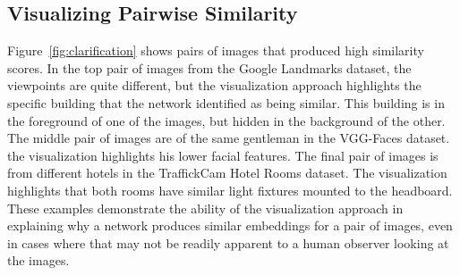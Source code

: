 \subsection{Visualizing Pairwise Similarity}
Figure~\ref{fig:clarification} shows pairs of images that produced high similarity scores. In the top pair of images from the Google Landmarks dataset, the viewpoints are quite different, but the visualization approach highlights the specific building that the network identified as being similar. This building is in the foreground of one of the images, but hidden in the background of the other. The middle pair of images are of the same gentleman in the VGG-Faces dataset. the visualization highlights his lower facial features. The final pair of images is from different hotels in the TraffickCam Hotel Rooms dataset. The visualization highlights that both rooms have similar light fixtures mounted to the headboard. These examples demonstrate the ability of the visualization approach in explaining why a network produces similar embeddings for a pair of images, even in cases where that may not be readily apparent to a human observer looking at the images.

